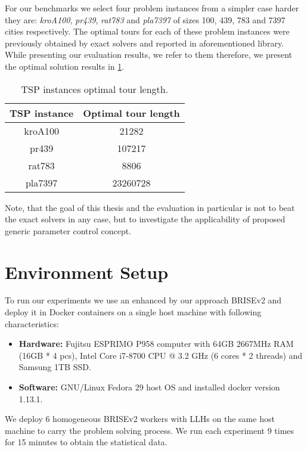 For our benchmarks we select four problem instances from a simpler case harder they are: \emph{kroA100}, \emph{pr439}, \emph{rat783} and \emph{pla7397} of sizes 100, 439, 783 and 7397 cities respectively. The optimal tours for each of these problem instances were previously obtained by exact solvers and reported in aforementioned library. While presenting our evaluation results, we refer to them therefore, we present the optimal solution results in \cref{eval:table:tsp optimal tour length}.

\begin{table}[h!]
	\centering
	\begin{tabular}{c||c}
		\textbf{TSP instance} & \textbf{Optimal tour length} \\
		\hline
		\hline
		kroA100 & 21282 \\
		pr439 & 107217 \\
		rat783 & 8806 \\
		pla7397 & 23260728 \\
	\end{tabular}
	\caption{TSP instances optimal tour length.}
	\label{eval:table:tsp optimal tour length}
\end{table}

Note, that the goal of this thesis and the evaluation in particular is not to beat the exact solvers in any case, but to investigate the applicability of proposed generic parameter control concept.

\section{Environment Setup}\label{eval: environment}
To run our experiments we use an enhanced by our approach BRISEv2 and deploy it in Docker containers on a single host machine with following characteristics:
\begin{itemize}
	\item \textbf{Hardware:} Fujitsu ESPRIMO P958 computer with 64GB 2667MHz RAM (16GB * 4 pcs), Intel Core i7-8700 CPU @ 3.2 GHz (6 cores * 2 threads) and Samsung 1TB SSD.
	
	\item \textbf{Software:} GNU/Linux Fedora 29 host OS and installed docker version 1.13.1.
\end{itemize}

We deploy 6 homogeneous BRISEv2 workers with LLHs on the same host machine to carry the problem solving process.
We run each experiment 9 times for 15 minutes to obtain the statistical data.


